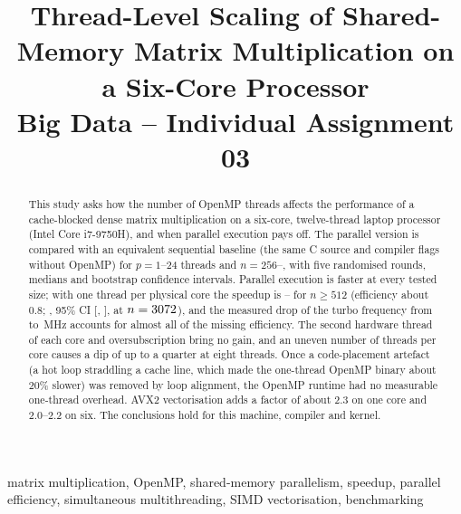 \documentclass[conference,a4paper]{IEEEtran}
\begin{document}
\title{Thread-Level Scaling of Shared-Memory Matrix Multiplication on a Six-Core Processor\\[0.3em]
\large Big Data -- Individual Assignment 03}

\author{
}

\maketitle

\begin{abstract}
This study asks how the number of OpenMP threads affects the performance of a cache-blocked dense
matrix multiplication on a six-core, twelve-thread laptop processor (Intel Core i7-9750H), and when parallel
execution pays off. The parallel version is compared with an equivalent sequential baseline (the same C source and
compiler flags without OpenMP) for $p=1$--24 threads and $n=256$--\NLargest, with five randomised rounds, medians and
bootstrap confidence intervals. Parallel execution is faster at every tested size; with one thread per physical core the
speedup is \SSixNTwentyFortyEight--\SSixNTenTwentyFour{} for $n\ge512$ (efficiency about 0.8; \SLargeSix{}, 95\% CI
[\SLargeLoSix, \SLargeHiSix], at $n=3072$), and the measured drop of the
turbo frequency from \FreqOne{} to \FreqSix\,MHz accounts for almost all of the missing efficiency. The second hardware
thread of each core and oversubscription bring no gain, and an uneven number of threads per core causes a dip of up to a
quarter at eight threads. Once a code-placement artefact (a hot loop straddling a cache line, which made the one-thread
OpenMP binary about 20\% slower) was removed by loop alignment, the OpenMP runtime had no measurable one-thread overhead.
AVX2 vectorisation adds a factor of about 2.3 on one core and 2.0--2.2 on six. The conclusions hold for this machine,
compiler and kernel.
\end{abstract}

\begin{IEEEkeywords}
matrix multiplication, OpenMP, shared-memory parallelism, speedup, parallel efficiency,
simultaneous multithreading, SIMD vectorisation, benchmarking
\end{IEEEkeywords}
\end{document}
